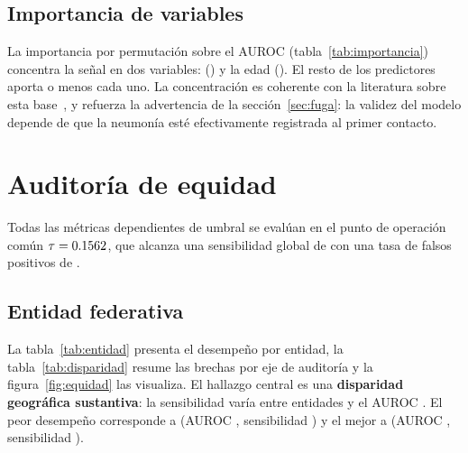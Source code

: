 
\subsection{Importancia de variables}
\label{sec:importancia}

La importancia por permutación sobre el AUROC (tabla~\ref{tab:importancia})
concentra la señal en dos variables: \texttt{\impPrimeraVar} (\impPrimera) y la
edad (\impSegunda). El resto de los predictores aporta \impTercera{} o menos cada
uno. La concentración es coherente con la literatura sobre esta
base~\parencite{becerra2022}, y refuerza la advertencia de la
sección~\ref{sec:fuga}: la validez del modelo depende de que la neumonía esté
efectivamente registrada al primer contacto.



\section{Auditoría de equidad}

Todas las métricas dependientes de umbral se evalúan en el punto de operación
común $\tau=0.1562$, que alcanza una sensibilidad global de
\tprObjetivo{} con una tasa de falsos positivos de \fprObjetivo.

\subsection{Entidad federativa}

La tabla~\ref{tab:entidad} presenta el desempeño por entidad, la
tabla~\ref{tab:disparidad} resume las brechas por eje de auditoría y la
figura~\ref{fig:equidad} las visualiza. El hallazgo
central es una \textbf{disparidad geográfica sustantiva}: la sensibilidad varía
\gapTPRentidad{} entre entidades y el AUROC \gapAUROCentidad. El peor desempeño
corresponde a \entPeor{} (AUROC \entPeorAUROC, sensibilidad \entPeorTPR) y el
mejor a \entMejor{} (AUROC \entMejorAUROC, sensibilidad \entMejorTPR).

